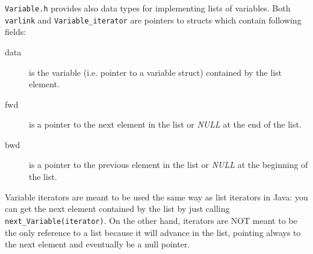 \documentclass[12pt,a4paper]{report}
\begin{document}
\verb+Variable.h+ provides also data types for implementing lists of
variables. Both \verb+varlink+ and \verb+Variable_iterator+ are
pointers to structs which contain following fields:
\begin{description}
\item[data] is the variable (i.e. pointer to a variable struct) 
contained by the list element.
\item[fwd] is a pointer to the next element in the list or {\it NULL}
at the end of the list.
\item[bwd] is a pointer to the previous element in the list or 
{\it NULL} at the beginning of the list.
\end{description}
Variable iterators are meant to be used the same way as list iterators
in Java: you can get the next element contained by the list by just 
calling \verb+next_Variable(iterator)+. On the other hand, iterators
are NOT meant to be the only reference to a list because it will
advance in the list, pointing always to the next element and eventually
be a null pointer.
\end{document}
